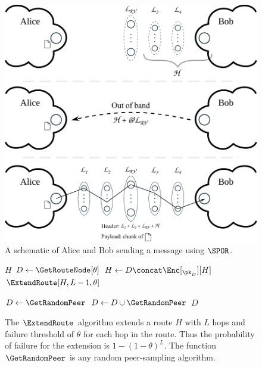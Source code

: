 \begin{figure}
  \includegraphics[width=\linewidth]{figures/file_exchange.pdf}
  \caption{\label{fig:file-exchange}%
    A schematic of Alice and Bob sending a message using \(\SPOR\).
  }
\end{figure}



\begin{figure}
  \begin{algorithmic}
        \State \Return $H$
      \EndIf
      \State $D\gets \GetRouteNode[\theta]$
      \State $H\gets D\concat \Enc[_{\pk_{D}}][H]$
      \State \Return $\ExtendRoute[H, L-1, \theta]$
    \EndFunction

    \Function{\GetRouteNode}{$\theta$}
      \State $D\gets \GetRandomPeer$
        \State $D\gets D\cup \GetRandomPeer$
      \EndWhile
      \State \Return $D$
    \EndFunction
  \end{algorithmic}
  \caption{\label{ExtendRoute}%
    The \(\ExtendRoute\) algorithm extends a route \(H\) with \(L\) hops and 
    failure threshold of \(\theta\) for each hop in the route.
    Thus the probability of failure for the extension is \(1 - (1 - \theta)^L\).
    The function \(\GetRandomPeer\) is any random peer-sampling algorithm.
  }
\end{figure}

